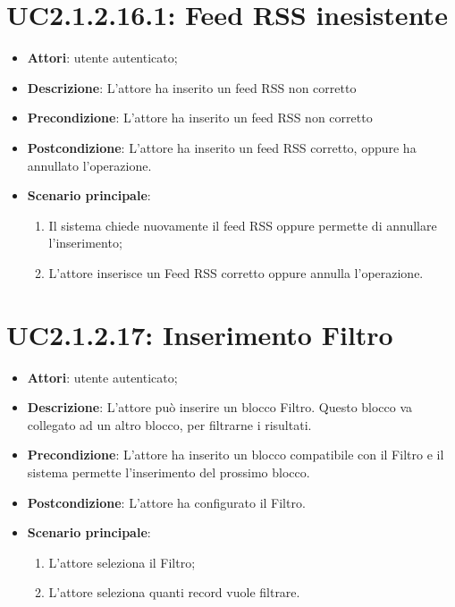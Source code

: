 \section{UC2.1.2.16.1: Feed RSS inesistente}
\label{UC2.1.2.16.1}
\begin{itemize}
	\item \textbf{Attori}: utente autenticato;
	\item \textbf{Descrizione}: L'attore ha inserito un feed RSS non corretto
	\item \textbf{Precondizione}: L'attore ha inserito un feed RSS non corretto
	\item \textbf{Postcondizione}: L'attore ha inserito un feed RSS corretto, oppure ha annullato l'operazione.
	\item \textbf{Scenario principale}:
	\begin{enumerate} \item Il sistema chiede nuovamente il feed RSS oppure permette di annullare l'inserimento;  \item  L'attore inserisce un Feed RSS corretto oppure annulla l'operazione.\end{enumerate}
\end{itemize}

\section{UC2.1.2.17: Inserimento Filtro}
\label{UC2.1.2.17}
\begin{itemize}
	\item \textbf{Attori}: utente autenticato;
	\item \textbf{Descrizione}: L'attore può inserire un blocco Filtro. Questo blocco va collegato ad un altro blocco, per filtrarne i risultati. 
	\item \textbf{Precondizione}: L'attore ha inserito un blocco compatibile con il Filtro e il sistema permette l'inserimento del prossimo blocco.
	\item \textbf{Postcondizione}: L'attore ha configurato il Filtro. 
	\item \textbf{Scenario principale}:
	\begin{enumerate} \item L'attore seleziona il Filtro;  \item  L'attore seleziona quanti record vuole filtrare.\end{enumerate}
\end{itemize}

